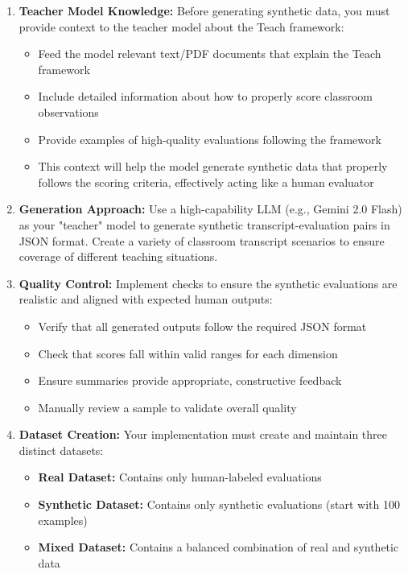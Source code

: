 \documentclass[11pt]{article}
\begin{document}
\begin{enumerate}
    \item \textbf{Teacher Model Knowledge:} Before generating synthetic data, you must provide context to the teacher model about the Teach framework:
    \begin{itemize}
        \item Feed the model relevant text/PDF documents that explain the Teach framework
        \item Include detailed information about how to properly score classroom observations
        \item Provide examples of high-quality evaluations following the framework
        \item This context will help the model generate synthetic data that properly follows the scoring criteria, effectively acting like a human evaluator
    \end{itemize}
    
    \item \textbf{Generation Approach:} Use a high-capability LLM (e.g., Gemini 2.0 Flash) as your "teacher" model to generate synthetic transcript-evaluation pairs in JSON format. Create a variety of classroom transcript scenarios to ensure coverage of different teaching situations.
    
    \item \textbf{Quality Control:} Implement checks to ensure the synthetic evaluations are realistic and aligned with expected human outputs:
    \begin{itemize}
        \item Verify that all generated outputs follow the required JSON format
        \item Check that scores fall within valid ranges for each dimension
        \item Ensure summaries provide appropriate, constructive feedback
        \item Manually review a sample to validate overall quality
    \end{itemize}
    
    \item \textbf{Dataset Creation:} Your implementation must create and maintain three distinct datasets:
    \begin{itemize}
        \item \textbf{Real Dataset:} Contains only human-labeled evaluations
        \item \textbf{Synthetic Dataset:} Contains only synthetic evaluations (start with 100 examples)
        \item \textbf{Mixed Dataset:} Contains a balanced combination of real and synthetic data
    \end{itemize}
    

\end{enumerate}
\end{document}
